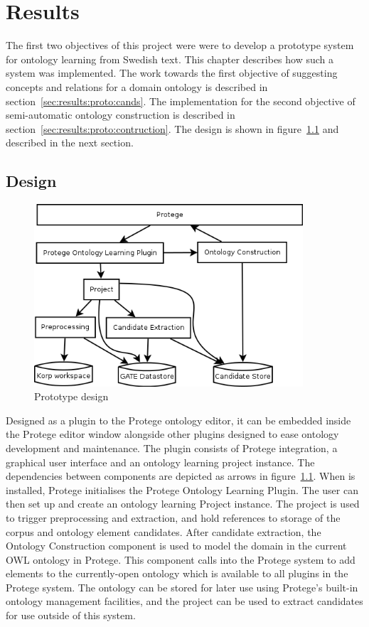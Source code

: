 \documentclass[a4paper]{report}
\begin{document}
\chapter{Results}
\label{chap:results}

The first two objectives of this project were were to develop a prototype system for ontology learning from Swedish text.
This chapter describes how such a system was implemented.
The work towards the first objective of suggesting concepts and relations for a domain ontology is described in section~\ref{sec:results:proto:cands}.
The implementation for the second objective of semi-automatic ontology construction is described in section~\ref{sec:results:proto:contruction}.
The design is shown in figure~\ref{fig:prototype-design} and described in the next section.

\section{Design}

\begin{figure}
  \includegraphics[width=10cm]{graphics/protege-plugin-components-simple.png}
  \caption{Prototype design}
  \label{fig:prototype-design}
\end{figure}

Designed as a plugin to the Protege ontology editor, it can be embedded inside the Protege editor window alongside other plugins designed to ease ontology development and maintenance.
The plugin consists of Protege integration, a graphical user interface and an ontology learning project instance.
The dependencies between components are depicted as arrows in figure~\ref{fig:prototype-design}.
When is installed, Protege initialises the Protege Ontology Learning Plugin.
The user can then set up and create an ontology learning Project instance.
The project is used to trigger preprocessing and extraction, and hold references to storage of the corpus and ontology element candidates.
After candidate extraction, the Ontology Construction component is used to model the domain in the current OWL ontology in Protege.
This component calls into the Protege system to add elements to the currently-open ontology which is available to all plugins in the Protege system.
The ontology can be stored for later use using Protege's built-in ontology management facilities, and the project can be used to extract candidates for use outside of this system.
\end{document}
